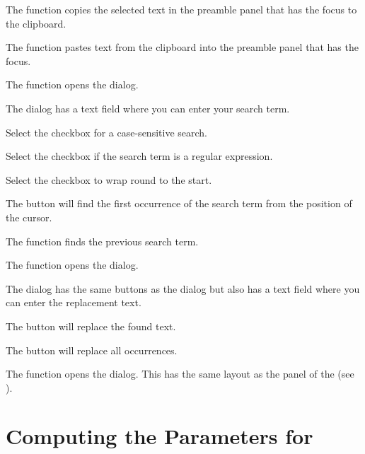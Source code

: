 %
The  function copies the selected text in the
preamble panel that has the focus to the clipboard.

%
The  function pastes text from the
clipboard into the preamble panel that has the focus.

%
The  function opens the 
dialog.

%
The  dialog has a text field where you can enter your
search term. 

%
Select the  checkbox for a case-sensitive search.

%
Select the  checkbox if the search term is a
regular expression.

%
Select the  checkbox to wrap round to the start.

%
The  button will find the first occurrence of the
search term from the position of the cursor.

%
The  function finds the previous
search term.

%
The  function opens the
 dialog.

%
The  dialog has the same buttons as the
 dialog but also has a text field where you can enter
the replacement text.

%
The  button will replace the found text.

%
The  button will replace all occurrences.

The  function opens the 
dialog. This has the same layout as the  panel
of the  (see ).


\section{Computing the Parameters for }\label{sec:parshape}

